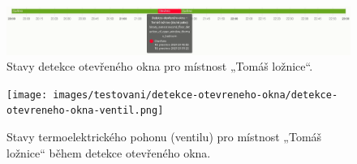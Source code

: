 \begin{figure}[H]
    \centering
    \includegraphics[width=\textwidth]{images/testovani/detekce-otevreneho-okna/detekce-otevreneho-okna.png}
    \caption{Stavy detekce otevřeného okna pro místnost „Tomáš ložnice“.}
    \label{fig:detekce-otevreneho-okna}
\end{figure}

\begin{figure}[H]
    \centering
    \texttt{[image: images/testovani/detekce-otevreneho-okna/detekce-otevreneho-okna-ventil.png]}
    \caption{Stavy termoelektrického pohonu (ventilu) pro místnost „Tomáš ložnice“ během detekce otevřeného okna.}
    \label{fig:detekce-otevreneho-okna-ventil}
\end{figure}




